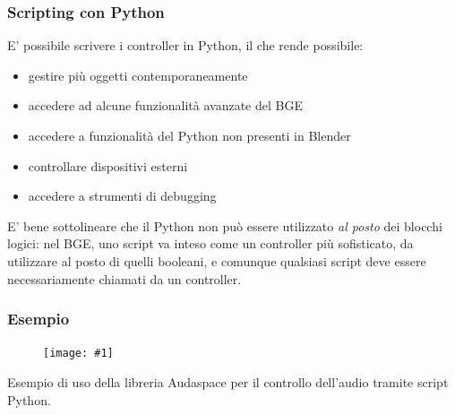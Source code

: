\documentclass{beamer}
\def\image[#1][#2]{
	\begin{figure}[H]
		\centering
		\texttt{[image: \#1]}
\end{figure}}
\begin{document}
		\begin{frame}
			\frametitle{Scripting con Python}
		E' possibile scrivere i controller in Python, il che rende possibile:
		\begin{itemize}
			\item gestire più oggetti contemporaneamente
			\item accedere ad alcune funzionalità avanzate del BGE
			\item accedere a funzionalità del Python non presenti in Blender
			\item controllare dispositivi esterni
			\item accedere a strumenti di debugging
		\end{itemize}
		E' bene sottolineare che \textcolor{BlenderOrange}{il Python non può essere utilizzato \textit{al posto} dei blocchi logici}: nel BGE, uno script va inteso come un controller più sofisticato, da utilizzare al posto di quelli booleani, e comunque qualsiasi script deve essere necessariamente chiamati da un controller.
	\end{frame}	
\begin{frame}
\frametitle{Esempio} %
\image[images/pysample.png][scale=0.23]
Esempio di uso della libreria Audaspace per il controllo dell'audio tramite script Python.
\end{frame}
		
\end{document}
